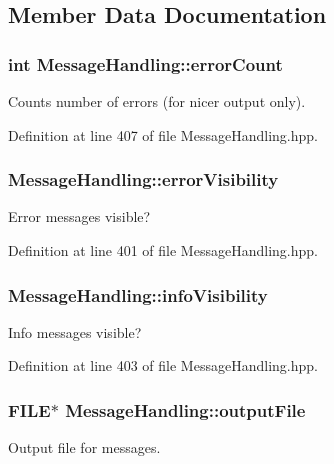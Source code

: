 \subsection{Member Data Documentation}
\subsubsection[{errorCount}]{\setlength{\rightskip}{0pt plus 5cm}int {\bf MessageHandling::errorCount}\hspace{0.3cm}{\ttfamily  [protected]}}\label{classMessageHandling_a3ac4bf299eed3c527b021630b77eee55}
Counts number of errors (for nicer output only). 

Definition at line 407 of file MessageHandling.hpp.

\subsubsection[{errorVisibility}]{ {\bf MessageHandling::errorVisibility}\hspace{0.3cm}{\ttfamily  [protected]}}\label{classMessageHandling_af75a2fd3122cc2a9793c5ad491b04325}
Error messages visible? 

Definition at line 401 of file MessageHandling.hpp.

\subsubsection[{infoVisibility}]{ {\bf MessageHandling::infoVisibility}\hspace{0.3cm}{\ttfamily  [protected]}}\label{classMessageHandling_a6a630fa427803cf4e1e0f54d8fb14a1b}
Info messages visible? 

Definition at line 403 of file MessageHandling.hpp.

\subsubsection[{outputFile}]{\setlength{\rightskip}{0pt plus 5cm}FILE$\ast$ {\bf MessageHandling::outputFile}\hspace{0.3cm}{\ttfamily  [protected]}}\label{classMessageHandling_a2a40cbdfced701a18da281f7a4e910ee}
Output file for messages. 

